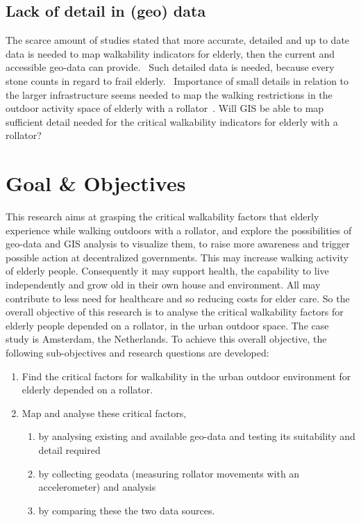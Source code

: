 \subsection{Lack of detail in (geo) data}
The scarce amount of studies stated that more accurate, detailed and up to date data is needed to map walkability indicators for elderly, then the current and accessible geo-data can provide.~\cite{Verschuur2013, Laakso2011} Such detailed data is needed, because every stone counts in regard to frail elderly.~\cite{Matthews2003, Laakso2011} Importance of small details in relation to the larger infrastructure seems needed to map the walking restrictions in the outdoor activity space of elderly with a rollator~\cite{Stahl2008, Stahl2013}. Will GIS be able to map sufficient detail needed for the critical walkability indicators for elderly with a rollator? 

\section{Goal \& Objectives}
This research aims at grasping the critical walkability factors that elderly experience while walking outdoors with a rollator, and explore the possibilities of geo-data and GIS analysis to visualize them, to raise more awareness and trigger possible action at decentralized governments. This may increase walking activity of elderly people. Consequently it may support health, the capability to live independently and grow old in their own house and environment. All may contribute to less need for healthcare and so reducing costs for elder care.
So the overall objective of this research is to analyse the critical walkability factors for elderly people depended on a rollator, in the urban outdoor space. The case study is Amsterdam, the Netherlands. To achieve this overall objective, the following sub-objectives and research questions are developed:

\flushleft
\begin{enumerate}
\item Find the critical factors for walkability in the urban outdoor environment for elderly depended on a rollator.
\item Map and analyse these critical factors, 
 \begin{enumerate}
 	\item by analysing existing and available geo-data and testing its suitability and detail required
 	\item by collecting geodata (measuring rollator movements with an accelerometer) and analysis
 	\item by comparing these the two data sources. 
 \end{enumerate}
\end{enumerate}



